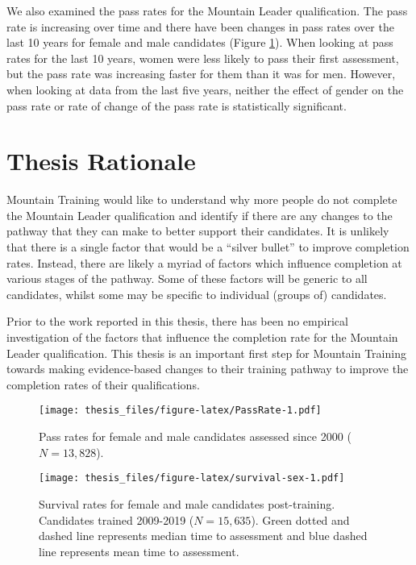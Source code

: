 \documentclass[
  12pt,
  a4paper,
]{book}
\begin{document}
We also examined the pass rates for the Mountain Leader qualification. The pass rate is increasing over time and there have been changes in pass rates over the last 10 years for female and male candidates (Figure \ref{fig:PassRate}). When looking at pass rates for the last 10 years, women were less likely to pass their first assessment, but the pass rate was increasing faster for them than it was for men. However, when looking at data from the last five years, neither the effect of gender on the pass rate or rate of change of the pass rate is statistically significant.

\hypertarget{thesis-rationale}{%
\section{Thesis Rationale}\label{thesis-rationale}}

Mountain Training would like to understand why more people do not complete the Mountain Leader qualification and identify if there are any changes to the pathway that they can make to better support their candidates. It is unlikely that there is a single factor that would be a ``silver bullet'' to improve completion rates. Instead, there are likely a myriad of factors which influence completion at various stages of the pathway. Some of these factors will be generic to all candidates, whilst some may be specific to individual (groups of) candidates.

Prior to the work reported in this thesis, there has been no empirical investigation of the factors that influence the completion rate for the Mountain Leader qualification. This thesis is an important first step for Mountain Training towards making evidence-based changes to their training pathway to improve the completion rates of their qualifications.

\begin{figure}
\centering
\texttt{[image: thesis\_files/figure-latex/PassRate-1.pdf]}
\caption{\label{fig:PassRate}Pass rates for female and male candidates assessed since 2000 (\(N = 13,828\)).}
\end{figure}

\begin{figure}
\centering
\texttt{[image: thesis\_files/figure-latex/survival-sex-1.pdf]}
\caption{\label{fig:survival-sex}Survival rates for female and male candidates post-training. Candidates trained 2009-2019 (\(N = 15,635\)). Green dotted and dashed line represents median time to assessment and blue dashed line represents mean time to assessment.}
\end{figure}
\end{document}
